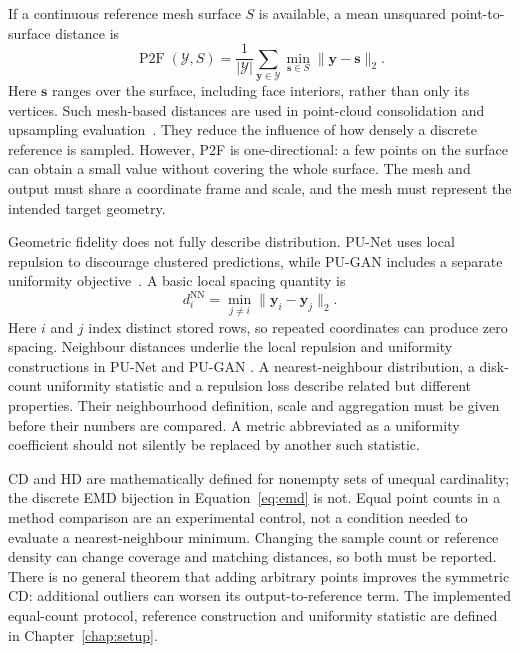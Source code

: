 If a continuous reference mesh surface $S$ is available, a mean unsquared
point-to-surface distance is
\begin{equation}
 \operatorname{P2F}(\mathcal Y,S)=\frac1{|\mathcal Y|}
 \sum_{\mathbf y\in\mathcal Y}\min_{\mathbf s\in S}\|\mathbf y-\mathbf s\|_2.
 \label{eq:p2f}
\end{equation}
Here $\mathbf s$ ranges over the surface, including face interiors, rather
than only its vertices. Such mesh-based distances are used in point-cloud
consolidation and upsampling evaluation~\cite{qian2021pugcn,yu2018ecnet}.
They reduce the influence of how densely a discrete reference is sampled.
However, P2F is one-directional: a few points on the surface can obtain a
small value without covering the whole surface. The mesh and output must
share a coordinate frame and scale, and the mesh must represent the intended
target geometry.

Geometric fidelity does not fully describe distribution. PU-Net uses local
repulsion to discourage clustered predictions, while PU-GAN includes a
separate uniformity objective~\cite{yu2018punet,li2019pugan}.
A basic local spacing quantity is
\begin{equation}
 d_i^\mathrm{NN}=\min_{j\ne i}\|\mathbf y_i-\mathbf y_j\|_2.
 \label{eq:nnd}
\end{equation}
Here $i$ and $j$ index distinct stored rows, so repeated coordinates can
produce zero spacing. Neighbour distances underlie the local repulsion
and uniformity constructions in PU-Net and PU-GAN
\cite{yu2018punet,li2019pugan}. A nearest-neighbour distribution, a disk-count
uniformity statistic and a repulsion loss describe related but different
properties. Their neighbourhood definition, scale and aggregation must be
given before their numbers are compared. A metric abbreviated as a
uniformity coefficient should not silently be replaced by another such
statistic.

CD and HD are mathematically defined for nonempty sets of unequal
cardinality; the discrete EMD bijection in Equation~\eqref{eq:emd} is not.
Equal point counts in a method comparison are an experimental control,
not a condition needed to evaluate a nearest-neighbour minimum. Changing
the sample count or reference density can change coverage and matching
distances, so both must be reported. There is no general theorem that
adding arbitrary points improves the symmetric CD: additional outliers
can worsen its output-to-reference term. The implemented equal-count
protocol, reference construction and uniformity statistic are defined in
Chapter~\ref{chap:setup}.

